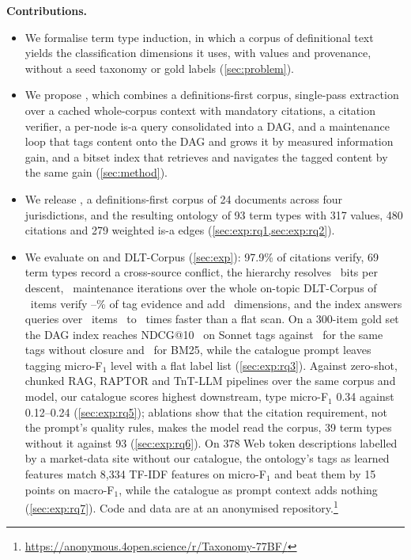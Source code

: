 \smallskip\noindent\textbf{Contributions.}
\begin{itemize}
  \item We formalise term type induction, in which a corpus of definitional
    text yields the classification dimensions it uses, with values and
    provenance, without a seed taxonomy or gold labels (\cref{sec:problem}).
  \item We propose \sys, which combines a definitions-first corpus, single-pass
    extraction over a cached whole-corpus context with mandatory citations, a
    citation verifier, a per-node is-a query consolidated into a DAG, and a
    maintenance loop that tags content onto the DAG and grows it by measured
    information gain, and a bitset index that retrieves and navigates the
    tagged content by the same gain (\cref{sec:method}).
  \item We release \corpus, a definitions-first corpus of 24 documents across
    four jurisdictions, and the resulting ontology of 93 term types with 317
    values, 480 citations and 279 weighted is-a edges
    (\cref{sec:exp:rq1,sec:exp:rq2}).
  \item We evaluate on \corpus and DLT-Corpus (\cref{sec:exp}): 97.9\% of
    citations verify, 69 term types record a cross-source conflict, the
    hierarchy resolves \BBits\ bits per descent, \NIterWord\ maintenance
    iterations over the whole on-topic DLT-Corpus of \AllItems\ items verify
    \EvidMin--\EvidMax\% of tag evidence and add \AllAddedTypes\ dimensions, and the index answers queries over \RItems\
    items \RSpeedMin\ to \RSpeedMax\ times faster than a flat scan. On a 300-item gold set the DAG index reaches NDCG@10 \RetSonNDCG\ on
    Sonnet tags against \RetSonFlatNDCG\ for the same tags without closure
    and \RetBMNDCG\ for BM25, while the catalogue prompt leaves tagging
    micro-F$_1$ level with a flat label list (\cref{sec:exp:rq3}). Against
    zero-shot, chunked RAG, RAPTOR and TnT-LLM pipelines over the same corpus
    and model, our catalogue scores highest downstream, type micro-F$_1$
    0.34 against 0.12--0.24 (\cref{sec:exp:rq5}); ablations show that the
    citation requirement, not the prompt's quality rules, makes the model read
    the corpus, 39 term types without it against 93 (\cref{sec:exp:rq6}). On
    378 Web token descriptions labelled by a market-data site without our
    catalogue, the ontology's tags as learned features match 8,334 TF-IDF
    features on micro-F$_1$ and beat them by 15 points on macro-F$_1$, while
    the catalogue as prompt context adds nothing (\cref{sec:exp:rq7}). Code and data are at an anonymised
    repository.\footnote{\url{https://anonymous.4open.science/r/Taxonomy-77BF/}}
\end{itemize}
